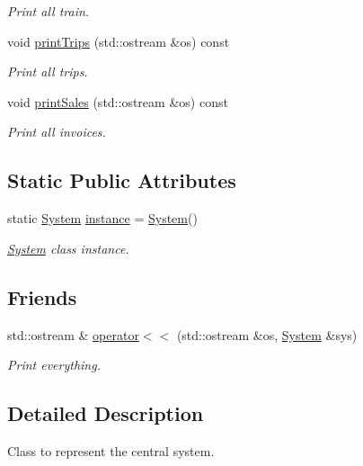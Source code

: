 \begin{DoxyCompactItemize}
\begin{DoxyCompactList}\small\item\em Print all train. \end{DoxyCompactList}\item 
void \mbox{\hyperlink{classSystem_abaa61b6377abcfc61da32092e5d734d9}{print\+Trips}} (std\+::ostream \&os) const
\begin{DoxyCompactList}\small\item\em Print all trips. \end{DoxyCompactList}\item 
void \mbox{\hyperlink{classSystem_aaad47fd0e1bf746a0bed32feb9553e53}{print\+Sales}} (std\+::ostream \&os) const
\begin{DoxyCompactList}\small\item\em Print all invoices. \end{DoxyCompactList}\end{DoxyCompactItemize}
\subsection*{Static Public Attributes}
\begin{DoxyCompactItemize}
\item 
static \mbox{\hyperlink{classSystem}{System}} \mbox{\hyperlink{classSystem_a40d348884d1b737ecd26b4bc6509bf48}{instance}} = \mbox{\hyperlink{classSystem}{System}}()
\begin{DoxyCompactList}\small\item\em \mbox{\hyperlink{classSystem}{System}} class instance. \end{DoxyCompactList}\end{DoxyCompactItemize}
\subsection*{Friends}
\begin{DoxyCompactItemize}
\item 
std\+::ostream \& \mbox{\hyperlink{classSystem_a1efa95132e95a7a6b11c3b54916d66ae}{operator$<$$<$}} (std\+::ostream \&os, \mbox{\hyperlink{classSystem}{System}} \&sys)
\begin{DoxyCompactList}\small\item\em Print everything. \end{DoxyCompactList}\end{DoxyCompactItemize}


\subsection{Detailed Description}
Class to represent the central system. 

